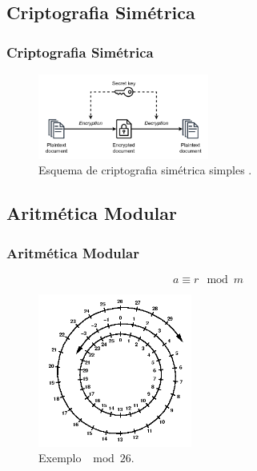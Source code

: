 \subsection{Criptografia Simétrica}
\begin{frame}
\frametitle{Criptografia Simétrica}
\begin{figure}[h]
\centering
\includegraphics[width=0.5\textwidth,height=0.5\textheight,keepaspectratio]{figures/simple_symmetric_encryption.png}
\caption{Esquema de criptografia simétrica simples \cite{paar2014}.}
\label{fig-simplesymmetric}
\end{figure}
\end{frame}

\subsection{Aritmética Modular}
\begin{frame}
\frametitle{Aritmética Modular}
\begin{equation}
a \equiv r \mod m
\end{equation}

\begin{figure}[h]
\centering
\includegraphics[width=0.45\textwidth,height=0.45\textheight,keepaspectratio]{figures/modulararithmetic.png}
\caption{Exemplo $\mod 26$.}
\label{fig-modulararithmetic}
\end{figure}
\end{frame}


